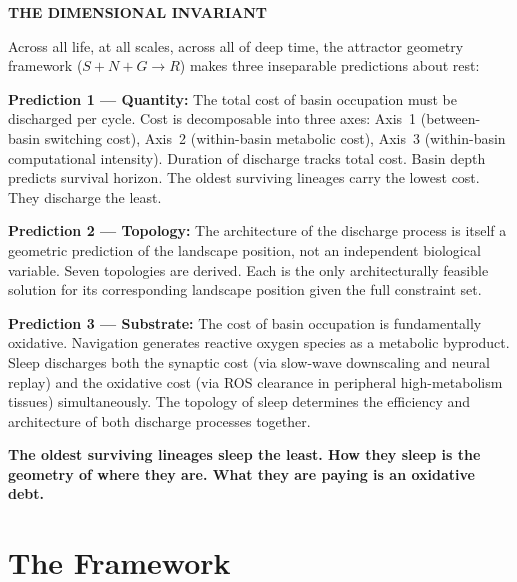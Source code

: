 \documentclass[10pt, a4paper]{article}
\begin{document}
\begin{mdframed}[
  backgroundcolor=claimbox,
  linecolor=claimbox,
  linewidth=0pt,
  innertopmargin=0.7em,
  innerbottommargin=0.7em,
  innerleftmargin=1.0em,
  innerrightmargin=1.0em
]
\color{white}
\textbf{THE DIMENSIONAL INVARIANT}

\medskip
Across all life, at all scales, across
all of deep time, the attractor geometry
framework ($S + N + G \rightarrow R$)
makes three inseparable predictions about
rest:

\medskip
\textbf{Prediction 1 --- Quantity:}
The total cost of basin occupation must
be discharged per cycle. Cost is
decomposable into three axes: Axis~1
(between-basin switching cost), Axis~2
(within-basin metabolic cost), Axis~3
(within-basin computational intensity).
Duration of discharge tracks total cost.
Basin depth predicts survival horizon.
The oldest surviving lineages carry the
lowest cost. They discharge the least.

\medskip
\textbf{Prediction 2 --- Topology:}
The architecture of the discharge process
is itself a geometric prediction of the
landscape position, not an independent
biological variable. Seven topologies
are derived. Each is the only
architecturally feasible solution for
its corresponding landscape position
given the full constraint set.

\medskip
\textbf{Prediction 3 --- Substrate:}
The cost of basin occupation is
fundamentally oxidative. Navigation
generates reactive oxygen species as a
metabolic byproduct. Sleep discharges
both the synaptic cost (via slow-wave
downscaling and neural replay) and the
oxidative cost (via ROS clearance in
peripheral high-metabolism tissues)
simultaneously. The topology of sleep
determines the efficiency and architecture
of both discharge processes together.

\medskip
\textbf{The oldest surviving lineages
sleep the least. How they sleep is the
geometry of where they are. What they
are paying is an oxidative debt.}
\end{mdframed}

\vspace{1em}

\section{The Framework}
\label{sec:framework}
\end{document}
